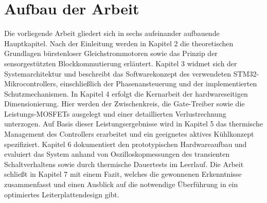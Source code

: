 \section{Aufbau der Arbeit}

Die vorliegende Arbeit gliedert sich in sechs aufeinander aufbauende Hauptkapitel. Nach der Einleitung werden in Kapitel 2 die theoretischen Grundlagen bürstenloser Gleichstrommotoren sowie das Prinzip der sensorgestützten Blockkommutierung erläutert. Kapitel 3 widmet sich der Systemarchitektur und beschreibt das Softwarekonzept des verwendeten STM32-Mikrocontrollers, einschließlich der Phasenansteuerung und der implementierten Schutzmechanismen. In Kapitel 4 erfolgt die Kernarbeit der hardwareseitigen Dimensionierung. Hier werden der Zwischenkreis, die Gate-Treiber sowie die Leistungs-MOSFETs ausgelegt und einer detaillierten Verlustrechnung unterzogen. Auf Basis dieser Leistungsergebnisse wird in Kapitel 5 das thermische Management des Controllers erarbeitet und ein geeignetes aktives Kühlkonzept spezifiziert. Kapitel 6 dokumentiert den prototypischen Hardwareaufbau und evaluiert das System anhand von Oszilloskopmessungen des transienten Schaltverhaltens sowie durch thermische Dauertests im Leerlauf. Die Arbeit schließt in Kapitel 7 mit einem Fazit, welches die gewonnenen Erkenntnisse zusammenfasst und einen Ausblick auf die notwendige Überführung in ein optimiertes Leiterplattendesign gibt.